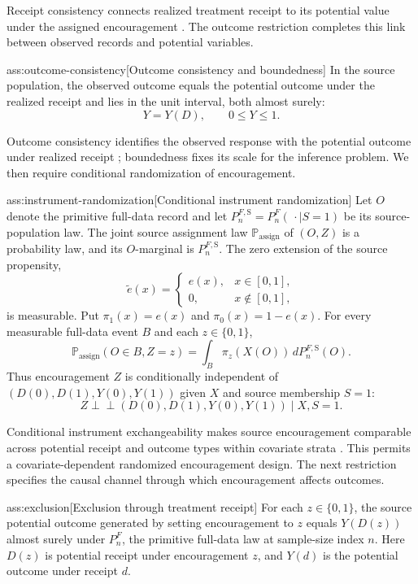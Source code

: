 \documentclass[11pt]{article}
\begin{document}
Receipt consistency connects realized treatment receipt to its potential value under the assigned encouragement \citep{ChenHuang2025Generalizing}. The outcome restriction completes this link between observed records and potential variables.

\begin{assumptionv}{ass:outcome-consistency}[Outcome consistency and boundedness]
In the source population, the observed outcome equals the potential outcome under the realized receipt and lies in the unit interval, both almost surely:
\[
Y=Y(D), \qquad 0\le Y\le 1.
\]
\end{assumptionv}

Outcome consistency identifies the observed response with the potential outcome under realized receipt \citep{ChenHuang2025Generalizing}; boundedness fixes its scale for the inference problem. We then require conditional randomization of encouragement.

\begin{assumptionv}{ass:instrument-randomization}[Conditional instrument randomization]
Let \(O\) denote the primitive full-data record and let \(P_n^{F,\mathrm S}=P_n^F(\,\cdot\mid S=1)\) be its source-population law. The joint source assignment law \(\mathbb P_{\mathrm{assign}}\) of \((O,Z)\) is a probability law, and its \(O\)-marginal is \(P_n^{F,\mathrm S}\). The zero extension of the source propensity,
\[
\widetilde e(x)=
\begin{cases}
e(x),&x\in[0,1],\\
0,&x\notin[0,1],
\end{cases}
\]
is measurable. Put \(\pi_1(x)=e(x)\) and \(\pi_0(x)=1-e(x)\). For every measurable full-data event \(B\) and each \(z\in\{0,1\}\),
\[
\mathbb P_{\mathrm{assign}}(O\in B, Z=z)
=\int_B \pi_z(X(O))\,dP_n^{F,\mathrm S}(O).
\]
Thus encouragement \(Z\) is conditionally independent of \((D(0),D(1),Y(0),Y(1))\) given \(X\) and source membership \(S=1\):
\[
Z\perp\!\!\!\perp (D(0),D(1),Y(0),Y(1))\mid X,S=1.
\]
\end{assumptionv}

Conditional instrument exchangeability makes source encouragement comparable across potential receipt and outcome types within covariate strata \citep{ChenHuang2025Generalizing}. This permits a covariate-dependent randomized encouragement design. The next restriction specifies the causal channel through which encouragement affects outcomes.

\begin{assumptionv}{ass:exclusion}[Exclusion through treatment receipt]
For each \(z\in\{0,1\}\), the source potential outcome generated by setting encouragement to \(z\) equals \(Y(D(z))\) almost surely under \(P_n^F\), the primitive full-data law at sample-size index \(n\). Here \(D(z)\) is potential receipt under encouragement \(z\), and \(Y(d)\) is the potential outcome under receipt \(d\).
\end{assumptionv}
\end{document}
